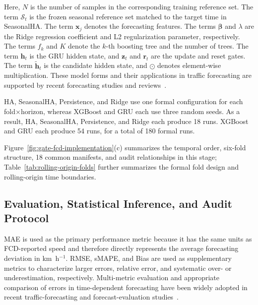 \documentclass[pdflatex,sn-mathphys-num,iicol]{sn-jnl}
\begin{document}
Here, $N$ is the number of samples in the corresponding training reference set. The term $\mathcal{S}_t$ is the frozen seasonal reference set matched to the target time in SeasonalHA. The term $\mathbf{x}_j$ denotes the forecasting features. The terms $\boldsymbol{\beta}$ and $\lambda$ are the Ridge regression coefficient and L2 regularization parameter, respectively. The terms $f_k$ and $K$ denote the $k$-th boosting tree and the number of trees. The term $\mathbf{h}_t$ is the GRU hidden state, and $\mathbf{z}_t$ and $\mathbf{r}_t$ are the update and reset gates. The term $\widetilde{\mathbf{h}}_t$ is the candidate hidden state, and $\odot$ denotes element-wise multiplication. These model forms and their applications in traffic forecasting are supported by recent forecasting studies and reviews~\cite{Hadry2025TrafficForecasting,Cini2024DeepEnsemble,Du2025TrafficSurvey,Khatiriolyaee2026TrafficPrediction,Liu2026DeepLearningReview}.

HA, SeasonalHA, Persistence, and Ridge use one formal configuration for each fold$\times$horizon, whereas XGBoost and GRU each use three random seeds. As a result, HA, SeasonalHA, Persistence, and Ridge each produce 18 runs. XGBoost and GRU each produce 54 runs, for a total of 180 formal runs.

Figure~\ref{fig:gate-fcd-implementation}(c) summarizes the temporal order, six-fold structure, 18 common manifests, and audit relationships in this stage; Table~\ref{tab:rolling-origin-folds} further summarizes the formal fold design and rolling-origin time boundaries.


\subsection{Evaluation, Statistical Inference, and Audit Protocol}
\label{subsec:evaluation-audit}

MAE is used as the primary performance metric because it has the same units as FCD-reported speed and therefore directly represents the average forecasting deviation in km~h$^{-1}$. RMSE, sMAPE, and Bias are used as supplementary metrics to characterize larger errors, relative error, and systematic over- or underestimation, respectively. Multi-metric evaluation and appropriate comparison of errors in time-dependent forecasting have been widely adopted in recent traffic-forecasting and forecast-evaluation studies~\cite{Hadry2025TrafficForecasting,Hewamalage2023ForecastEvaluation}.
\end{document}
